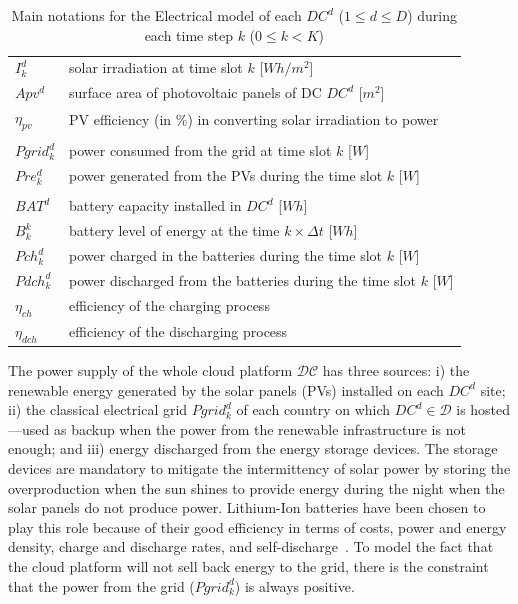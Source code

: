 \begin{table}[t]
\caption{Main notations for the Electrical model of each $DC^d$ ($1\leq d\leq D$) during each time step $k$ ($0\leq k<K$)\label{table:variablesElec}}
\begin{center}
\begin{tabular}{l p{6cm}}
$I^d_k$ & solar irradiation at time slot $k$ [$Wh/m^2$] \\
$Apv^d$ & surface area of photovoltaic panels of DC $DC^d$ [$m^2$] \\ 
$\eta_{pv}$ & PV efficiency (in \%) in converting solar irradiation to power \\
\\
$Pgrid_k^d$ & power consumed from the grid at time slot $k$ [$W$]\\
$Pre_k^d$ & power generated from the PVs during the time slot $k$ [$W$] \\
\\
$BAT^d$ & battery capacity installed in $DC^d$ [$Wh$] \\
$B_k^k$ & battery level of energy at the time $k\times\Delta t$ [$Wh$] \\
$Pch_k^d$ & power charged in the batteries during the time slot $k$ [$W$]\\
$Pdch_k^d$ & power discharged from the batteries during the time slot $k$ [$W$] \\
$\eta_{ch}$ & efficiency of the charging process  \\
$\eta_{dch}$ & efficiency of the discharging process  \\

\end{tabular}
\end{center}
\end{table}


The power supply of the whole cloud platform $\mathcal{DC}$ has three sources: i) the renewable energy generated by the solar panels (PVs) installed on each $DC^d$ site; ii)  the classical electrical grid $Pgrid_k^d$ of each country on which $DC^d\in\mathcal{D}$ is hosted---used as backup when the power from the renewable infrastructure is not enough; and iii) energy discharged from the energy storage devices. The storage devices are mandatory to mitigate the intermittency of solar power by storing the overproduction when the sun shines to provide energy during the night when the solar panels do not produce power. Lithium-Ion batteries have been chosen to play this role because of their good efficiency in terms of costs, power and energy density, charge and discharge rates, and self-discharge~\cite{wang2012_EDCS}. To model the fact that the cloud platform will not sell back energy to the grid, there is the constraint that the power from the grid ($Pgrid^d_k$) is always positive.

